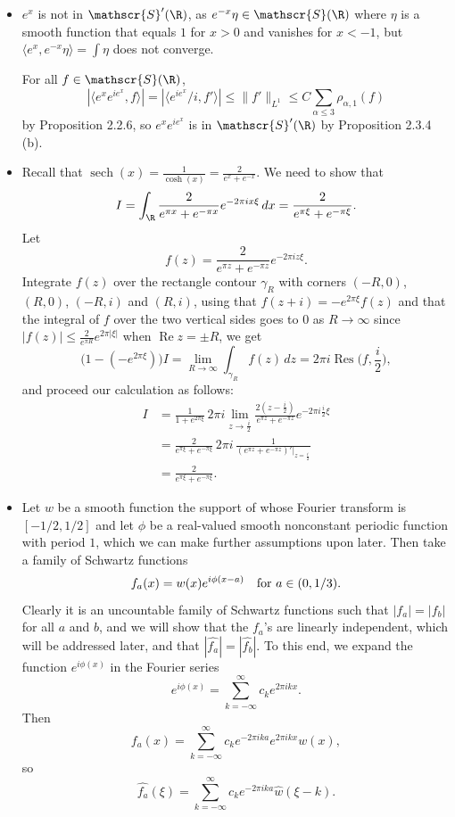 \begin{itemize}
\item[2.4.3]

$e^x$ is not in $\mathscr{S}'(\R)$, as $e^{-x}\eta\in\mathscr{S}(\R)$ where 
$\eta$ is a smooth function that equals $1$ for $x>0$ and vanishes for $x<-1$, 
but $\langle e^x,e^{-x}\eta\rangle=\int\eta$ does not converge.

For all $f\in\mathscr{S}(\R)$,
$$|\langle e^xe^{ie^x},f\rangle|=|\langle e^{ie^x}\!/i,f'\rangle|
\leq\|f'\|_{L^1}\leq C\sum_{\alpha\leq3}\rho_{\alpha,1}(f)$$
by Proposition 2.2.6, so $e^xe^{ie^x}$ is in $\mathscr{S}'(\R)$ by Proposition 2.3.4 (b).

\item[2.4.4]

Recall that $\operatorname{sech}(x)=\frac{1}{\cosh(x)}=\frac{2}{e^{x}+e^{-x}}$. 
We need to show that
$$I=\int_\R\frac{2}{e^{\pi x}+e^{-\pi x}}e^{-2\pi ix\xi}\,dx=\frac{2}{e^{\pi\xi}+e^{-\pi\xi}}.$$
Let $$f(z)=\frac{2}{e^{\pi z}+e^{-\pi z}}e^{-2\pi iz\xi}.$$
Integrate $f(z)$ over the rectangle contour $\gamma_R$ 
with corners $(-R,0)$, $(R,0)$, $(-R,i)$ and $(R,i)$, 
using that $f(z+i)=-e^{2\pi\xi}f(z)$ and that the integral of $f$ 
over the two vertical sides goes to $0$ as $R\rightarrow\infty$ 
since $|f(z)|\leq \frac{2}{e^{\pi R}}e^{2\pi|\xi|}$ 
when $\operatorname{Re}z=\pm R$, we get
$$\big(1-(-e^{2\pi\xi})\big)I=\lim_{R\rightarrow\infty}\int_{\gamma_R}f(z)\,dz
=2\pi i\operatorname{Res}\Big(f,\frac{i}{2}\Big),$$
and proceed our calculation as follows:
\begin{align*}
    I&=\frac{1}{1+e^{2\pi\xi}}\,2\pi i\lim_{z\rightarrow\frac{i}{2}}\frac{2(z-\frac{i}{2})}{e^{\pi z}+e^{-\pi z}}e^{-2\pi i\frac{i}{2}\xi}\\
    &=\frac{2}{e^{\pi\xi}+e^{-\pi\xi}}\,2\pi i\,\frac{1}{(e^{\pi z}+e^{-\pi z})'|_{z=\frac{i}{2}}}\\
    &=\frac{2}{e^{\pi\xi}+e^{-\pi\xi}}.
\end{align*}

\item[2.4.5]

Let $w$ be a smooth function the support of whose Fourier transform is $[-1/2,1/2]$ 
and let $\phi$ be a real-valued smooth nonconstant periodic function with period $1$, 
which we can make further assumptions upon later. 
Then take a family of Schwartz functions
$$f_a(x)=w(x)e^{i\phi(x-a)}\quad\textup{for }a\in(0,1/3).$$
Clearly it is an uncountable family of Schwartz functions 
such that $|f_a|=|f_b|$ for all $a$ and $b$, and we will show that 
the $f_a$'s are linearly independent, which will be addressed later, 
and that $|\widehat{f_a}|=|\widehat{f_b}|$. 
To this end, we expand the function $e^{i\phi(x)}$ in the Fourier series
$$e^{i\phi(x)}=\sum_{k=-\infty}^\infty c_ke^{2\pi ikx}.$$
Then
$$f_a(x)=\sum_{k=-\infty}^\infty c_ke^{-2\pi ika}e^{2\pi ikx}w(x),$$
so
$$\widehat{f_a}(\xi)=\sum_{k=-\infty}^\infty c_ke^{-2\pi ika}\widehat{w}(\xi-k).$$


\end{itemize}
